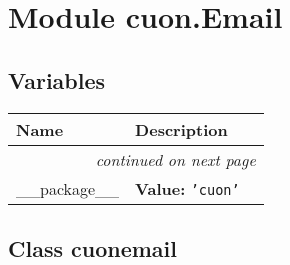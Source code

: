 %
%
%


\section{Module cuon.Email}

    \label{cuon:Email}


  \subsection{Variables}

    \vspace{-1cm}
\hspace{\varindent}\begin{longtable}{|p{\varnamewidth}|p{\vardescrwidth}|l}
\cline{1-2}
\cline{1-2} \centering \textbf{Name} & \centering \textbf{Description}& \\
\cline{1-2}
\endhead\cline{1-2}\multicolumn{3}{r}{\small\textit{continued on next page}}\\\endfoot\cline{1-2}
\endlastfoot\raggedright \_\-\_\-p\-a\-c\-k\-a\-g\-e\-\_\-\_\- & \raggedright \textbf{Value:} 
{\tt \texttt{'}\texttt{cuon}\texttt{'}}&\\
\cline{1-2}
\end{longtable}



\subsection{Class cuonemail}

